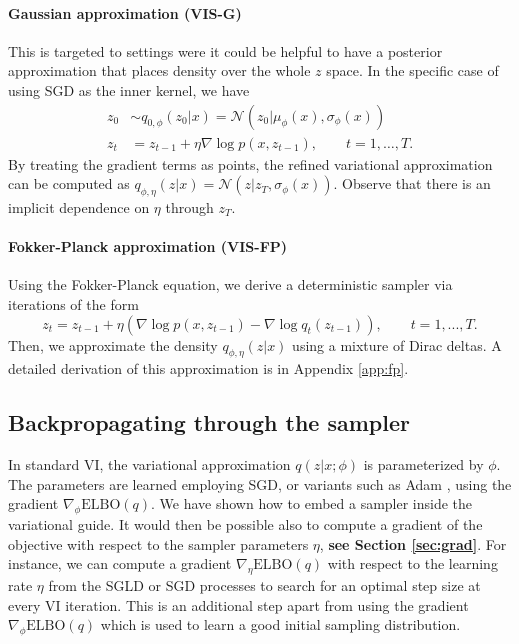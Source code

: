         \paragraph{Gaussian approximation (VIS-G)} This is targeted to settings were it could be helpful to have a posterior approximation that places density over the whole
        $z$ space. In the specific case of using SGD as the inner kernel, we have
\begin{align*}
z_0 &\sim q_{0,\phi}(z_0|x) = \mathcal{N}(z_0 | \mu_\phi(x), \sigma_\phi(x))\\
z_t &= z_{t-1} + \eta \nabla \log p(x, z_{t-1}), \qquad t=1,\ldots,T.
\end{align*}
By treating the gradient terms as points, the refined variational approximation can be computed as
$ q_{\phi,\eta}(z|x) = \mathcal{N}(z | z_T, \sigma_\phi(x))$. Observe 
that there is an implicit dependence on $\eta$ through $z_T$.

    
    \paragraph{Fokker-Planck approximation (VIS-FP)} Using the Fokker-Planck equation, we derive 
    a deterministic sampler via iterations of the form
\begin{equation*}
z_{t} = z_{t-1} + \eta (\nabla \log p(x, z_{t-1}) - \nabla \log q_t (z_{t-1})),\qquad  t=1, ..., T\bm{.}
\end{equation*}
Then, we approximate the density $q_{\phi,\eta}(z|x)$ using a mixture of Dirac deltas. A detailed derivation of this approximation is in Appendix \ref{app:fp}. 


\subsection{Backpropagating through the sampler}\label{sec:tuning}

In standard VI, the variational approximation $q(z|x;\phi)$ is parameterized by $\phi$. The parameters are learned employing SGD, or variants such as Adam \cite{kingma2014adam}, using the gradient $\nabla_{\phi} \mbox{ELBO}(q)$. We have shown how to embed a sampler inside the variational guide. 
It would then be possible also to compute a gradient of the objective with respect to the sampler parameters $\eta$, {\bf see Section \ref{sec:grad}}. For instance, we can compute a gradient
$\nabla_{\eta} \mbox{ELBO}(q)$
with respect to the learning rate $\eta$ from the SGLD or SGD processes to search for an optimal step size at every VI iteration. This is an additional step apart from using the gradient $\nabla_{\phi} \mbox{ELBO}(q)$ which is used to learn a good initial sampling distribution.


